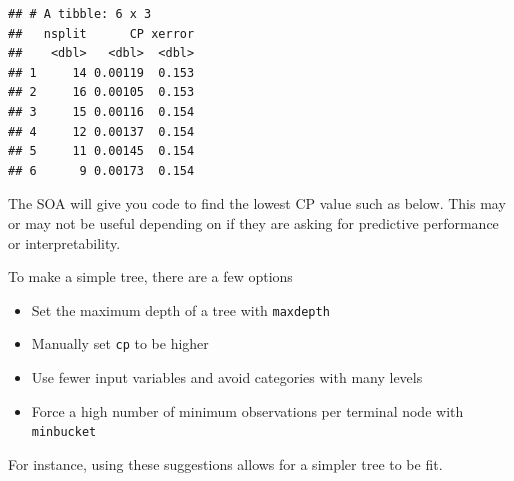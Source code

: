 \documentclass[openany]{book}
\newenvironment{Shaded}{\begin{snugshade}}{\end{snugshade}}
\newcommand{\DataTypeTok}[1]{\textcolor[rgb]{0.13,0.29,0.53}{#1}}
\newcommand{\KeywordTok}[1]{\textcolor[rgb]{0.13,0.29,0.53}{\textbf{#1}}}
\newcommand{\NormalTok}[1]{#1}
\newcommand{\OperatorTok}[1]{\textcolor[rgb]{0.81,0.36,0.00}{\textbf{#1}}}
\newcommand{\StringTok}[1]{\textcolor[rgb]{0.31,0.60,0.02}{#1}}
\providecommand{\tightlist}{%
  \setlength{\itemsep}{0pt}\setlength{\parskip}{0pt}}
\begin{document}
\begin{verbatim}
## # A tibble: 6 x 3
##   nsplit      CP xerror
##    <dbl>   <dbl>  <dbl>
## 1     14 0.00119  0.153
## 2     16 0.00105  0.153
## 3     15 0.00116  0.154
## 4     12 0.00137  0.154
## 5     11 0.00145  0.154
## 6      9 0.00173  0.154
\end{verbatim}

The SOA will give you code to find the lowest CP value such as below. This may or may not be useful depending on if they are asking for predictive performance or interpretability.

\begin{Shaded}
\end{Shaded}

To make a simple tree, there are a few options

\begin{itemize}
\tightlist
\item
  Set the maximum depth of a tree with \texttt{maxdepth}
\item
  Manually set \texttt{cp} to be higher
\item
  Use fewer input variables and avoid categories with many levels
\item
  Force a high number of minimum observations per terminal node with \texttt{minbucket}
\end{itemize}

For instance, using these suggestions allows for a simpler tree to be fit.
\end{document}
